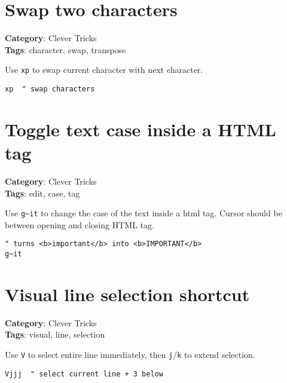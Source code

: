 {{\section{Swap two characters}

\textbf{Category}: Clever Tricks\\ \textbf{Tags}: character, swap, transpose
\vspace{0.5cm}

Use {\footnotesize \Verb§xp§} to swap current character with next character.

\begin{Exa*}{}
\begin{Verbatim}[fontsize=\footnotesize, breaklines, breakanywhere]
xp  " swap characters
\end{Verbatim}
\end{Exa*}

\section{Toggle text case inside a HTML tag}

\textbf{Category}: Clever Tricks\\ \textbf{Tags}: edit, case, tag
\vspace{0.5cm}

Use {\footnotesize \Verb§g~it§} to change the case of the text inside a html tag. Cursor should be between opening and closing HTML tag.

\begin{Exa*}{}
\begin{Verbatim}[fontsize=\footnotesize, breaklines, breakanywhere]
" turns <b>important</b> into <b>IMPORTANT</b>
g~it
\end{Verbatim}
\end{Exa*}

\section{Visual line selection shortcut}

\textbf{Category}: Clever Tricks\\ \textbf{Tags}: visual, line, selection
\vspace{0.5cm}

Use {\footnotesize \Verb§V§} to select entire line immediately, then {\footnotesize \Verb§j§}/{\footnotesize \Verb§k§} to extend selection.

\begin{Exa*}{}
\begin{Verbatim}[fontsize=\footnotesize, breaklines, breakanywhere]
Vjjj  " select current line + 3 below
\end{Verbatim}
\end{Exa*}

}}
